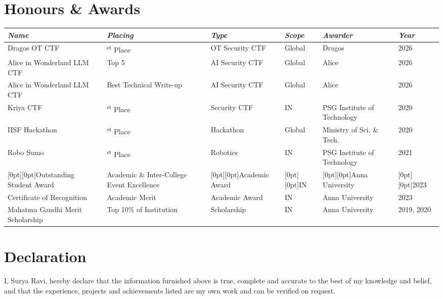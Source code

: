 \documentclass[a4paper,10pt]{article}
\newcommand{\ord}[2]{#1\textsuperscript{#2}} %
\newcommand{\awardsTable}[1]{
 \begin{tabularx}{\textwidth}{l>{\raggedright\arraybackslash}Xllll}
 \emph{Name}	& \emph{Placing}	& \emph{Type}	& \emph{Scope}	& \emph{Awarder}                 & \emph{Year}       \\
 \midrule
 #1
 \end{tabularx}
 }
\newcommand{\midcell}[1]{\raisebox{-11pt}[0pt][0pt]{#1}}
\newcommand{\awardsTableRow}[6]{
 \BeginAccSupp{method=plain, ActualText=11\string\t 21}#1 & #2 & #3 & #4 & #5 & #6\EndAccSupp{} \\
 }
\begin{document}
\section{Honours \& Awards}
\setlength{\tabcolsep}{6.0pt}
\renewcommand{\arraystretch}{1.0}
\fontsize{8.5}{11}\selectfont
\awardsTable{
  \awardsTableRow{Dragos OT CTF}{\ord{1}{st} Place}{OT Security CTF}{Global}{Dragos}{2026}
  \awardsTableRow{Alice in Wonderland LLM CTF}{Top 5}{AI Security CTF}{Global}{Alice}{2026}
  \awardsTableRow{Alice in Wonderland LLM CTF}{Best Technical Write-up}{AI Security CTF}{Global}{Alice}{2026}
  \awardsTableRow{Kriya CTF}{\ord{1}{st} Place}{Security CTF}{IN}{PSG Institute of Technology}{2020} \hline
  \awardsTableRow{IISF Hackathon}{\ord{1}{st} Place}{Hackathon}{Global}{Ministry of Sci. \& Tech.}{2020}
  \awardsTableRow{Robo Sumo}{\ord{1}{st} Place}{Robotics}{IN}{PSG Institute of Technology}{2021} \hline
  \awardsTableRow{\midcell{Outstanding Student Award}}{Academic \& Inter-College Event Excellence}{\midcell{Academic Award}}{\midcell{IN}}{\midcell{Anna University}}{\midcell{2023}}
  \awardsTableRow{Certificate of Recognition}{Academic Merit}{Academic Award}{IN}{Anna University}{2023}
  \awardsTableRow{Mahatma Gandhi Merit Scholarship}{Top 10\% of Institution}{Scholarship}{IN}{Anna University}{2019, 2020}
 }

\normalsize
\section{Declaration}
\small{I, Surya Ravi, hereby declare that the information furnished above is true,
complete and accurate to the best of my knowledge and belief, and that the
experience, projects and achievements listed are my own work and can be verified
on request.}
\end{document}

